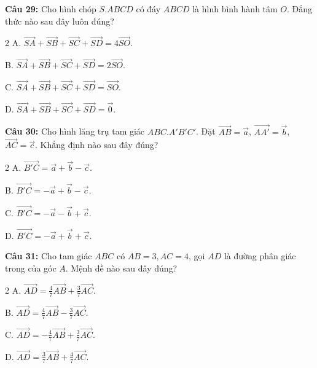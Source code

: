 \documentclass[12pt]{article}
\begin{document}
	\vspace{0.2cm}
	\noindent \textbf{Câu 29:} Cho hình chóp $S.ABCD$ có đáy $ABCD$ là hình bình hành tâm $O$. Đẳng thức nào sau đây luôn đúng?
	\begin{multicols}{2}
		A. $\overrightarrow{SA} + \overrightarrow{SB} + \overrightarrow{SC} + \overrightarrow{SD} = 4\overrightarrow{SO}$. \par
		B. $\overrightarrow{SA} + \overrightarrow{SB} + \overrightarrow{SC} + \overrightarrow{SD} = 2\overrightarrow{SO}$. \par
		C. $\overrightarrow{SA} + \overrightarrow{SB} + \overrightarrow{SC} + \overrightarrow{SD} = \overrightarrow{SO}$. \par
		D. $\overrightarrow{SA} + \overrightarrow{SB} + \overrightarrow{SC} + \overrightarrow{SD} = \vec{0}$.
	\end{multicols}
	
	\noindent \textbf{Câu 30:} Cho hình lăng trụ tam giác $ABC.A'B'C'$. Đặt $\overrightarrow{AB} = \vec{a}$, $\overrightarrow{AA'} = \vec{b}$, $\overrightarrow{AC} = \vec{c}$. Khẳng định nào sau đây đúng?
	\begin{multicols}{2}
		A. $\overrightarrow{B'C} = \vec{a} + \vec{b} - \vec{c}$. \par
		B. $\overrightarrow{B'C} = -\vec{a} + \vec{b} - \vec{c}$. \par
		C. $\overrightarrow{B'C} = -\vec{a} - \vec{b} + \vec{c}$. \par
		D. $\overrightarrow{B'C} = -\vec{a} + \vec{b} + \vec{c}$.
	\end{multicols}
	
	\vspace{0.2cm}
	\noindent \textbf{Câu 31:} Cho tam giác $ABC$ có $AB = 3, AC = 4$, gọi $AD$ là đường phân giác trong của góc $A$. Mệnh đề nào sau đây đúng?
	\begin{multicols}{2}
		A. $\overrightarrow{AD} = \frac{4}{7}\overrightarrow{AB} + \frac{3}{7}\overrightarrow{AC}$. \par
		B. $\overrightarrow{AD} = \frac{4}{7}\overrightarrow{AB} - \frac{3}{7}\overrightarrow{AC}$. \par
		C. $\overrightarrow{AD} = -\frac{4}{7}\overrightarrow{AB} + \frac{3}{7}\overrightarrow{AC}$. \par
		D. $\overrightarrow{AD} = \frac{3}{7}\overrightarrow{AB} + \frac{4}{7}\overrightarrow{AC}$.
	\end{multicols}
	
\end{document}
